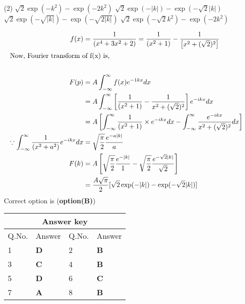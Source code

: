 \begin{enumerate}
	\begin{tasks}(2)
		\task[\textbf{A.}] $\sqrt{2} \exp \left(-k^{2}\right)-\exp \left(-2 k^{2}\right)$
		\task[\textbf{B.}]$\sqrt{2} \exp (-|k|)-\exp (-\sqrt{2}|k|)$
		\task[\textbf{C.}] $\sqrt{2} \exp (-\sqrt{|k|})-\exp (-\sqrt{2|k|})$
		\task[\textbf{D.}]$\sqrt{2} \exp \left(-\sqrt{2} k^{2}\right)-\exp \left(-2 k^{2}\right)$
	\end{tasks}
	\begin{answer}
		\begin{align*}
		f(x)&=\frac{1}{\left(x^{4}+3 x^{2}+2\right)}=\frac{1}{\left(x^{2}+1\right)}-\frac{1}{\left[x^{2}+(\sqrt{2})^{2}\right]}\\
		\intertext{Now, Fourier transform of f(x) is,}\\
		F(p)&=A \int_{-\infty}^{\infty} f(x) e^{-1 k x} d x\\
		&=A \int_{-\infty}^{\infty}\left[\frac{1}{\left(x^{2}+1\right)}-\frac{1}{x^{2}+(\sqrt{2})^{2}}\right] e^{-i k x} d x\\&=A\left[\int_{-\infty}^{\infty} \frac{1}{\left(x^{2}+1\right)} \times e^{-i k x} d x-\int_{-\infty}^{\infty} \frac{e^{-i k x}}{x^{2}+(\sqrt{2})^{2}} d x\right]\\
		\because \int_{-\infty}^{\infty} \frac{1}{\left(x^{2}+a^{2}\right)} e^{-i k x} d x&=\sqrt{\frac{\pi}{2}} \frac{e^{-a|k|}}{a}\\
		F(k)&=A\left[\sqrt{\frac{\pi}{2}} \frac{e^{-|k|}}{1}-\sqrt{\frac{\pi}{2}} \frac{e^{-\sqrt{2}|k|}}{\sqrt{2}}\right]\\&=\frac{A \sqrt{\pi}}{2}[\sqrt{2} \exp (-|k|)-\exp (-\sqrt{2}|k|)]
		\end{align*}
		Correct option is (\textbf{option(B)})
	\end{answer}
\end{enumerate}
\setlength\arrayrulewidth{1pt}
\begin{table}[H]
	\centering
	\begin{tabular}{|p{1.5cm}|p{1.5cm}||p{1.5cm}|p{1.5cm}|}
		\hline
		\multicolumn{4}{|c|}{\textbf{Answer key}}\\\hline\hline
		\rowcolor{ocrel}Q.No.&Answer&Q.No.&Answer\\\hline
		1&\textbf{D} &2&\textbf{B}\\\hline 
		3&\textbf{C} &4&\textbf{B} \\\hline
		5&\textbf{D} &6&\textbf{C} \\\hline
		7&\textbf{A}&8&\textbf{B}\\\hline
		
		
	\end{tabular}
\end{table}
